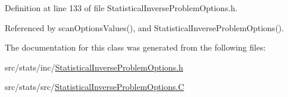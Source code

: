 Definition at line 133 of file Statistical\-Inverse\-Problem\-Options.\-h.



Referenced by scan\-Options\-Values(), and Statistical\-Inverse\-Problem\-Options().



The documentation for this class was generated from the following files\-:\begin{DoxyCompactItemize}
\item 
src/stats/inc/\hyperlink{_statistical_inverse_problem_options_8h}{Statistical\-Inverse\-Problem\-Options.\-h}\item 
src/stats/src/\hyperlink{_statistical_inverse_problem_options_8_c}{Statistical\-Inverse\-Problem\-Options.\-C}\end{DoxyCompactItemize}
